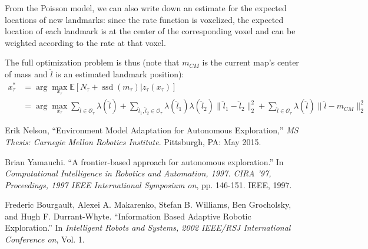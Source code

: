 \documentclass[12pt]{article}
\DeclareMathOperator{\ssd}{ssd}
\begin{document}
From the Poisson model, we can also write down an estimate for the expected locations of new landmarks: since the rate function is voxelized, the expected location of each landmark is at the center of the corresponding voxel and can be weighted according to the rate at that voxel.

The full optimization problem is thus (note that $m_{CM}$ is the current map's center of mass and $\hat l$ is an estimated landmark position):
\begin{align}
  x_{\tau}^*
  &= \arg \max_{x_{\tau}} \mathbb{E}[N_{\tau} + \ssd(m_{\tau}) | z_{\tau}(x_{\tau})]\\
  &= \arg \max_{x_{\tau}} \sum_{\hat l \in \mathcal{O_{\tau}}} \lambda(\hat l) + \sum_{\hat l_1, \hat l_2 \in \mathcal{O}_{\tau}} \lambda(\hat l_1) \lambda(\hat l_2) \|\hat l_1 - \hat l_2\|_2^2 + \sum_{\hat l \in \mathcal{O}_{\tau}} \lambda(\hat l) \|\hat l - m_{CM}\|_2^2
\end{align}


\begin{thebibliography}{99}

 Erik Nelson, ``Environment Model Adaptation for Autonomous Exploration,'' \textit{MS Thesis: Carnegie Mellon Robotics Institute}. Pittsburgh, PA: May 2015.

 Brian Yamauchi. ``A frontier-based approach for autonomous exploration.'' In \textit{Computational Intelligence in Robotics and Automation, 1997. CIRA '97, Proceedings, 1997 IEEE International Symposium on}, pp. 146-151. IEEE, 1997.

 Frederic Bourgault, Alexei A. Makarenko, Stefan B. Williams, Ben Grocholsky, and Hugh F. Durrant-Whyte. ``Information Based Adaptive Robotic Exploration.'' In \textit{Intelligent Robots and Systems, 2002 IEEE/RSJ International Conference on}, Vol. 1.
  
\end{thebibliography}
\end{document}
